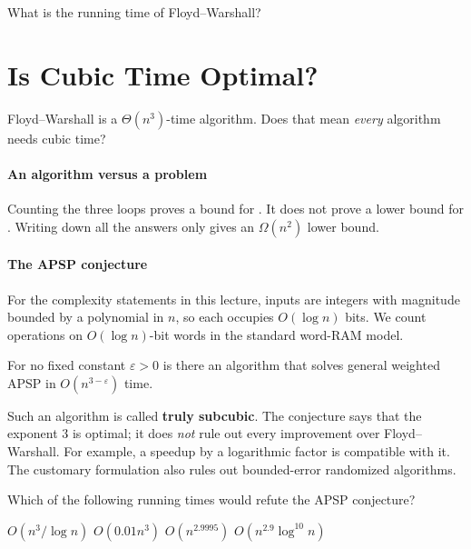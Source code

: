 \documentclass[11  pt]{article}
\begin{document}
\begin{Qu}
What is the running time of Floyd--Warshall?
\end{Qu}

\newpage
\section{Is Cubic Time Optimal?}
Floyd--Warshall is a $\Theta(n^3)$-time algorithm.
Does that mean \emph{every} algorithm needs cubic time?

\paragraph{An algorithm versus a problem}
Counting the three loops proves a bound for .
It does not prove a lower bound for .
Writing down all the answers only gives an $\Omega(n^2)$ lower bound.

\paragraph{The APSP conjecture}
For the complexity statements in this lecture, inputs are integers with
magnitude bounded by a polynomial in $n$, so each occupies $O(\log n)$ bits.
We count operations on $O(\log n)$-bit words in the standard word-RAM model.

\begin{conjecture}
For no fixed constant $\varepsilon>0$ is there an algorithm that solves
general weighted APSP in $O(n^{3-\varepsilon})$ time.
\end{conjecture}

Such an algorithm is called \textbf{truly subcubic}.
The conjecture says that the exponent $3$ is optimal;
it does \emph{not} rule out every improvement over Floyd--Warshall.
For example, a speedup by a logarithmic factor is compatible with it.
The customary formulation also rules out bounded-error randomized algorithms.

\begin{Qu}
Which of the following running times would refute the APSP conjecture?
\begin{itemize}
 \aitem $O(n^3/\log n)$
 \bitem $O(0.01n^3)$
 \citem $O(n^{2.9995})$
 \ditem $O(n^{2.9}\log^{10}n)$
\end{itemize}
\end{Qu}
\end{document}
